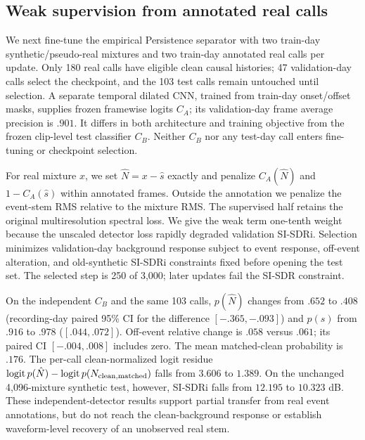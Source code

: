 \documentclass[conference]{IEEEtran}
\begin{document}
\subsection{Weak supervision from annotated real calls}
We next fine-tune the empirical Persistence separator with two train-day
synthetic/pseudo-real mixtures and two train-day annotated real calls per
update. Only 180 real calls have eligible clean causal histories; 47
validation-day calls select the checkpoint, and the 103 test calls remain
untouched until selection. A separate temporal dilated CNN, trained from
train-day onset/offset masks, supplies frozen framewise logits $C_A$; its
validation-day frame average precision is $.901$. It differs in both
architecture and training objective from the frozen clip-level test
classifier $C_B$. Neither $C_B$ nor any test-day call enters fine-tuning or
checkpoint selection.

For real mixture $x$, we set $\hat N=x-\hat s$ exactly and penalize
$C_A(\hat N)$ and $1-C_A(\hat s)$ within annotated frames. Outside the
annotation we penalize the event-stem RMS relative to the mixture RMS.
The supervised half retains the original multiresolution spectral loss.
We give the weak term one-tenth weight because the unscaled detector loss
rapidly degraded validation SI-SDRi. Selection minimizes validation-day
background response subject to event response, off-event alteration, and
old-synthetic SI-SDRi constraints fixed before opening the test set. The
selected step is 250 of 3,000; later updates fail the SI-SDR constraint.

On the independent $C_B$ and the same 103 calls, $p(\hat N)$ changes from
$.652$ to $.408$ (recording-day paired 95\% CI for the difference
$[-.365,-.093]$) and $p(\hat s)$ from $.916$ to $.978$
($[.044,.072]$). Off-event relative change is $.058$ versus $.061$;
its paired CI $[-.004,.008]$ includes zero. The mean matched-clean
probability is $.176$. The per-call clean-normalized logit residue
$\operatorname{logit}p(\hat N)-\operatorname{logit}p(N_{\rm clean,matched})$
falls from $3.606$ to $1.389$. On the unchanged 4,096-mixture synthetic
test, however, SI-SDRi falls from $12.195$ to $10.323$ dB. These
independent-detector results support partial transfer from real event
annotations, but do not reach the clean-background response or establish
waveform-level recovery of an unobserved real stem.
\end{document}
